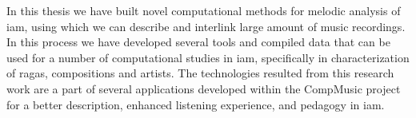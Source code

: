 In this thesis we have built novel computational methods for melodic analysis of \gls{iam}, using which we can describe and interlink large amount of music recordings. In this process we have developed several tools and compiled data that can be used for a number of computational studies in \gls{iam}, specifically in characterization of ragas, compositions and artists. The technologies resulted from this research work are a part of several applications developed within the CompMusic project for a better description, enhanced listening experience, and pedagogy in \gls{iam}.

\newpage
{}
%
%	
%	
%	
%	
%	
%	
%	
%	

